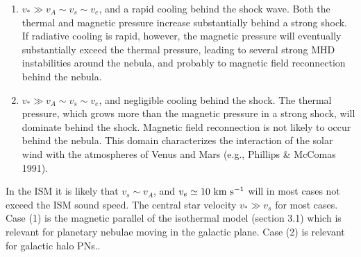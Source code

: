 \begin{enumerate}
\item $v_\ast \gg v_A \sim v_s \sim v_e$, and a rapid cooling behind the
shock wave.
Both the thermal and magnetic pressure increase substantially behind
a strong shock. If radiative cooling is rapid, however, the magnetic pressure
will eventually substantially exceed the thermal pressure, leading to
several strong MHD instabilities around the nebula, and probably to
magnetic field reconnection behind the nebula.

\item $v_\ast \gg v_A \sim v_s \sim v_e$, and negligible cooling behind the
shock. The thermal pressure, which grows more than the magnetic pressure in a
strong shock, will dominate behind the shock.
 Magnetic field reconnection is not likely to occur behind the nebula.
This domain characterizes the interaction of the solar wind with
the atmospheres of Venus and Mars (e.g., Phillips \& McComas 1991).
\end{enumerate}

In the ISM it is likely that $v_s \sim v_A$, and
$v_e \simeq 10 ~\rm{km} ~\rm{s}^{-1}$ will in most cases not exceed the ISM sound speed.
The central star velocity $v_\ast \gg v_s$ for most cases.
Case (1) is the magnetic parallel of the isothermal model (section 3.1)
which is relevant for planetary nebulae moving in the galactic plane.
Case (2) is relevant for galactic halo PNs..


